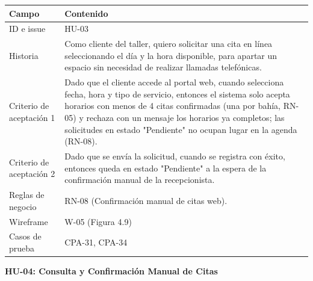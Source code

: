 {\def\LTcaptype{none} %
\begin{longtable}[]{@{}
  >{\raggedright\arraybackslash}p{}
  >{\raggedright\arraybackslash}p{}@{}}
\toprule\noalign{}
\begin{minipage}[b]{\linewidth}\raggedright
\textbf{Campo}
\end{minipage} & \begin{minipage}[b]{\linewidth}\raggedright
\textbf{Contenido}
\end{minipage} \\
\midrule\noalign{}
\endhead
\bottomrule\noalign{}
\endlastfoot
ID e issue & HU-03 \\
Historia & Como cliente del taller, quiero solicitar una cita en línea
seleccionando el día y la hora disponible, para apartar un espacio sin
necesidad de realizar llamadas telefónicas. \\
Criterio de aceptación 1 & Dado que el cliente accede al portal web,
cuando selecciona fecha, hora y tipo de servicio, entonces el sistema
solo acepta horarios con menos de 4 citas confirmadas (una por bahía,
RN-05) y rechaza con un mensaje los horarios ya completos; las
solicitudes en estado "Pendiente" no ocupan lugar en la agenda
(RN-08). \\
Criterio de aceptación 2 & Dado que se envía la solicitud, cuando se
registra con éxito, entonces queda en estado "Pendiente" a la espera de
la confirmación manual de la recepcionista. \\
Reglas de negocio & RN-08 (Confirmación manual de citas web). \\
Wireframe & W-05 (Figura 4.9) \\
Casos de prueba & CPA-31, CPA-34 \\
\end{longtable}
}

\textbf{HU-04: Consulta y Confirmación Manual de Citas}

